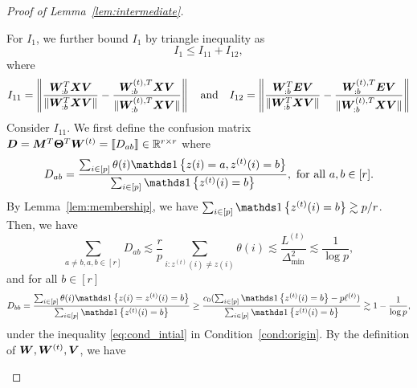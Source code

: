 \documentclass[lettersize,onecolumn,journal]{IEEEtran}
\theoremstyle{definition}
\theoremstyle{definition}
\newcommand{\of}[1]{\left(#1\right)}
\newcommand{\offf}[1]{\left\{#1\right\}}
\begin{document}
\begin{proof}[Proof of Lemma~\ref{lem:intermediate}]
\begin{enumerate}
    For $I_1$, we further bound $I_1$ by triangle inequality as
    \begin{equation}
        I_1 \leq I_{11} + I_{12},
    \end{equation}
    where
     \begin{equation}
        I_{11} = \left\lVert \frac{ \bm{W}_{:b}^T \bm X \bm{V}  }{\lVert  \bm{W}_{:b}^T \bm X \bm{V} \rVert} - \frac{ \bm{W}_{:b}^{(t), T} \bm X \bm{V}  }{ \lVert\bm{W}_{:b}^{(t), T} \bm X \bm{V} \rVert}   \right\rVert \quad \text{and} \quad I_{12} = \left\lVert \frac{\bm{W}_{:b}^T \bm{E} \bm{V}}{ \lVert  \bm{W}_{:b}^T \bm X \bm{V} \rVert} - \frac{\bm{W}_{:b}^{(t),T} \bm{E} \bm{V}}{ \lVert  \bm{W}_{:b}^{(t),T} \bm X \bm{V} \rVert} \right\rVert
    \end{equation}
    Consider $I_{11}$. We first define the confusion matrix $\bm{D} = \bm M^T \boldsymbol{\Theta}^T \bm{W}^{(t)} = \llbracket D_{ab} \rrbracket \in \mathbb{R}^{r \times r}$ where 
    \begin{equation}
        D_{ab} = \frac{\sum_{i \in [p]}  \theta(i) \ind \offf{ z(i) = a, z^{(t)}(i) = b } }{\sum_{i \in [p]}  \ind\offf{  z^{(t)}(i) = b }}, \text{  for all } a, b \in [r].
    \end{equation}
    By Lemma~\ref{lem:membership},  we have $\sum_{i \in [p]}  \ind\offf{  z^{(t)}(i) = b } \gtrsim p/r$. Then, we have
    \begin{equation}\label{eq:dab_bound}
        \sum_{a \neq b, a,b \in [r]} D_{ab} \lesssim \frac{r}{p} \sum_{i \colon z^{(t)}(i) \neq z(i)} \theta(i) \lesssim\frac{L^{(t)}}{\Delta_{\min}^2}  \lesssim \frac{1}{\log p}, 
    \end{equation}
    and for all $b \in [r]$
    \begin{equation}\label{eq:dbb_bound}
        D_{bb} = \frac{\sum_{i \in [p]}  \theta(i) \ind \offf{ z(i) = z^{(t)}(i) = b } }{\sum_{i \in [p]}  \ind\offf{  z^{(t)}(i) = b }} \geq \frac{c_0(\sum_{i \in [p]}  \ind\offf{  z^{(t)}(i) = b } - p\ell^{(t)})}{\sum_{i \in [p]}  \ind\offf{  z^{(t)}(i) = b }} \gtrsim 1 - \frac{1}{\log p},
    \end{equation}
    under the inequality \eqref{eq:cond_intial} in Condition~\ref{cond:origin}. By the definition of $\bm{W},\bm{W}^{(t)},\bm{V}$, we have 

\end{enumerate}
\end{proof}
\end{document}
